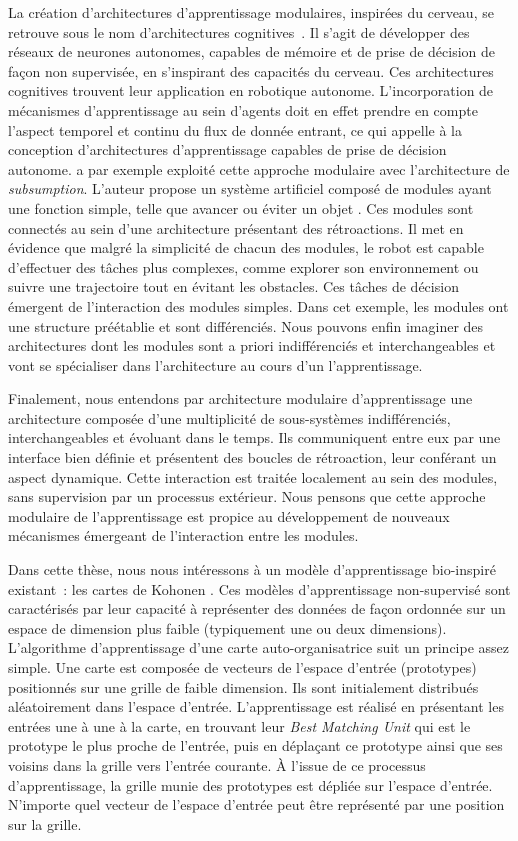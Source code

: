 La création d'architectures d'apprentissage modulaires, inspirées du cerveau, se retrouve sous le nom d'architectures cognitives~\parencite{Kotseruba201840YO}. Il s'agit de développer des réseaux de neurones autonomes, capables de mémoire et de prise de décision de façon non supervisée, en s'inspirant des capacités du cerveau.
Ces architectures cognitives trouvent leur application en robotique autonome.
L'incorporation de mécanismes d'apprentissage au sein d'agents doit en effet prendre en compte l'aspect temporel et continu du flux de donnée entrant, ce qui appelle à la conception d'architectures d'apprentissage capables de prise de décision autonome.
\cite{brooks_sumsumption_85} a par exemple exploité cette approche modulaire avec l'architecture de \emph{subsumption}. L'auteur propose un système artificiel composé de modules ayant une fonction simple, telle que \og avancer \fg{} ou \og éviter un objet \fg{}. Ces modules sont connectés au sein d'une architecture présentant des rétroactions. Il met en évidence que malgré la simplicité de chacun des modules, le robot est capable d'effectuer des tâches plus complexes, comme explorer son environnement ou suivre une trajectoire tout en évitant les obstacles. Ces tâches de décision émergent de l'interaction des modules simples.
Dans cet exemple, les modules ont une structure préétablie et sont différenciés. Nous pouvons enfin imaginer des architectures dont les modules sont a priori indifférenciés et interchangeables et vont se spécialiser dans l'architecture au cours d'un l'apprentissage. 


Finalement, nous entendons par architecture modulaire d'apprentissage une architecture composée d'une multiplicité de sous-systèmes indifférenciés, interchangeables et évoluant dans le temps.
Ils communiquent entre eux par une interface bien définie et présentent des boucles de rétroaction, leur conférant un aspect dynamique. Cette interaction est traitée localement au sein des modules, sans supervision par un processus extérieur.
Nous pensons que cette approche modulaire de l'apprentissage est propice au développement de nouveaux mécanismes émergeant de l'interaction entre les modules.

Dans cette thèse, nous nous intéressons à un modèle d'apprentissage bio-inspiré existant~: les cartes de Kohonen \parencite{Kohonen1982}. Ces modèles d'apprentissage non-supervisé sont caractérisés par leur capacité à représenter des données de façon ordonnée sur un espace de dimension plus faible (typiquement une ou deux dimensions).
L'algorithme d'apprentissage d'une carte auto-organisatrice suit un principe assez simple. Une carte est composée de vecteurs de l'espace d'entrée (prototypes) positionnés sur une grille de faible dimension.
Ils sont initialement distribués aléatoirement dans l'espace d'entrée. 
L'apprentissage est réalisé en présentant les entrées une à une à la carte, en trouvant leur \emph{Best Matching Unit} qui est le prototype le plus proche de l'entrée, puis en déplaçant ce prototype ainsi que ses voisins dans la grille vers l'entrée courante.
\`A l'issue de ce processus d'apprentissage, la grille munie des prototypes est dépliée sur l'espace d'entrée. N'importe quel vecteur de l'espace d'entrée peut être représenté par une position sur la grille.

